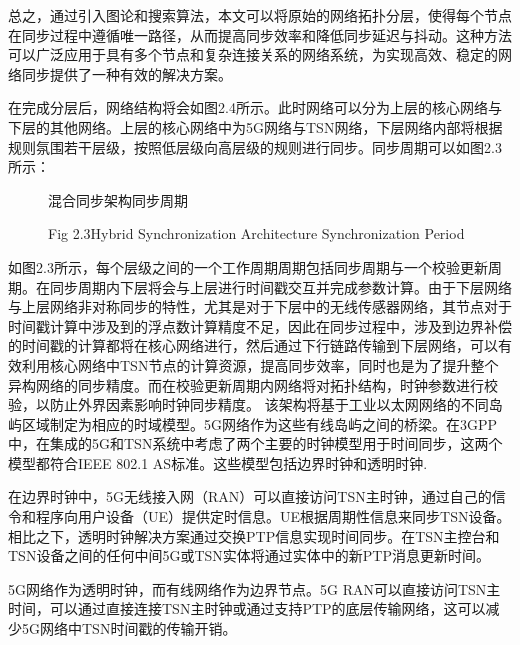 \documentclass[UTF8,a4paper,12pt]{ctexart}
\numberwithin{equation}{section}
\begin{document}
	总之，通过引入图论和搜索算法，本文可以将原始的网络拓扑分层，使得每个节点在同步过程中遵循唯一路径，从而提高同步效率和降低同步延迟与抖动。这种方法可以广泛应用于具有多个节点和复杂连接关系的网络系统，为实现高效、稳定的网络同步提供了一种有效的解决方案。
	
	
	在完成分层后，网络结构将会如图2.4所示。此时网络可以分为上层的核心网络与下层的其他网络。上层的核心网络中为5G网络与TSN网络，下层网络内部将根据规则氛围若干层级，按照低层级向高层级的规则进行同步。同步周期可以如图2.3所示：
	
	\begin{figure}[htb]
		\caption{混合同步架构同步周期}
		\vspace{-10pt}
		\caption*{Fig 2.3\quad Hybrid Synchronization Architecture Synchronization Period}
	\end{figure}
	如图2.3所示，每个层级之间的一个工作周期周期包括同步周期与一个校验更新周期。在同步周期内下层将会与上层进行时间戳交互并完成参数计算。由于下层网络与上层网络非对称同步的特性，尤其是对于下层中的无线传感器网络，其节点对于时间戳计算中涉及到的浮点数计算精度不足，因此在同步过程中，涉及到边界补偿的时间戳的计算都将在核心网络进行，然后通过下行链路传输到下层网络，可以有效利用核心网络中TSN节点的计算资源，提高同步效率，同时也是为了提升整个异构网络的同步精度。而在校验更新周期内网络将对拓扑结构，时钟参数进行校验，以防止外界因素影响时钟同步精度。
	该架构将基于工业以太网网络的不同岛屿区域制定为相应的时域模型。5G网络作为这些有线岛屿之间的桥梁。在3GPP中，在集成的5G和TSN系统中考虑了两个主要的时钟模型用于时间同步，这两个模型都符合IEEE 802.1 AS标准。这些模型包括边界时钟和透明时钟\cite{9615318}.
	
	在边界时钟中，5G无线接入网（RAN）可以直接访问TSN主时钟，通过自己的信令和程序向用户设备（UE）提供定时信息。UE根据周期性信息来同步TSN设备。相比之下，透明时钟解决方案通过交换PTP信息实现时间同步。在TSN主控台和TSN设备之间的任何中间5G或TSN实体将通过实体中的新PTP消息更新时间。
	
	5G网络作为透明时钟，而有线网络作为边界节点。5G RAN可以直接访问TSN主时间，可以通过直接连接TSN主时钟或通过支持PTP的底层传输网络，这可以减少5G网络中TSN时间戳的传输开销。
	
\end{document}
